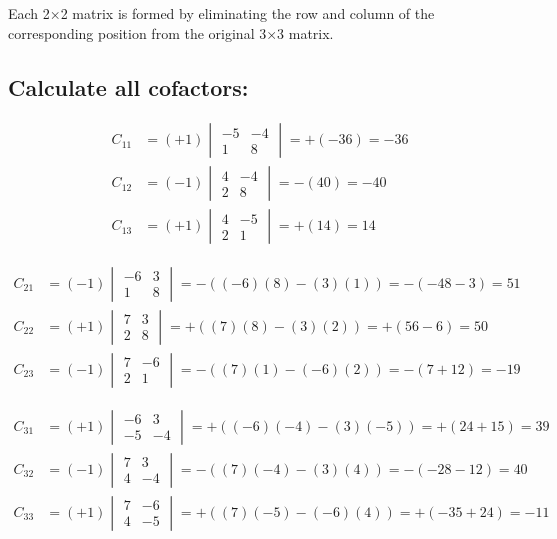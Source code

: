 \documentclass[12pt]{article}
\begin{document}
Each 2×2 matrix is formed by eliminating the row and column of the corresponding position from the original 3×3 matrix.

\subsection{Calculate all cofactors:}

\begin{align}
C_{11} &= (+1) \begin{vmatrix} -5 & -4 \\ 1 & 8 \end{vmatrix} = +(-36) = -36 \\
C_{12} &= (-1) \begin{vmatrix} 4 & -4 \\ 2 & 8 \end{vmatrix} = -(40) = -40 \\
C_{13} &= (+1) \begin{vmatrix} 4 & -5 \\ 2 & 1 \end{vmatrix} = +(14) = 14
\end{align}

\begin{align}
C_{21} &= (-1) \begin{vmatrix} -6 & 3 \\ 1 & 8 \end{vmatrix} = -((-6)(8) - (3)(1)) = -(-48 - 3) = 51 \\
C_{22} &= (+1) \begin{vmatrix} 7 & 3 \\ 2 & 8 \end{vmatrix} = +((7)(8) - (3)(2)) = +(56 - 6) = 50 \\
C_{23} &= (-1) \begin{vmatrix} 7 & -6 \\ 2 & 1 \end{vmatrix} = -((7)(1) - (-6)(2)) = -(7 + 12) = -19
\end{align}

\begin{align}
C_{31} &= (+1) \begin{vmatrix} -6 & 3 \\ -5 & -4 \end{vmatrix} = +((-6)(-4) - (3)(-5)) = +(24 + 15) = 39 \\
C_{32} &= (-1) \begin{vmatrix} 7 & 3 \\ 4 & -4 \end{vmatrix} = -((7)(-4) - (3)(4)) = -(-28 - 12) = 40 \\
C_{33} &= (+1) \begin{vmatrix} 7 & -6 \\ 4 & -5 \end{vmatrix} = +((7)(-5) - (-6)(4)) = +(-35 + 24) = -11
\end{align}
\end{document}
